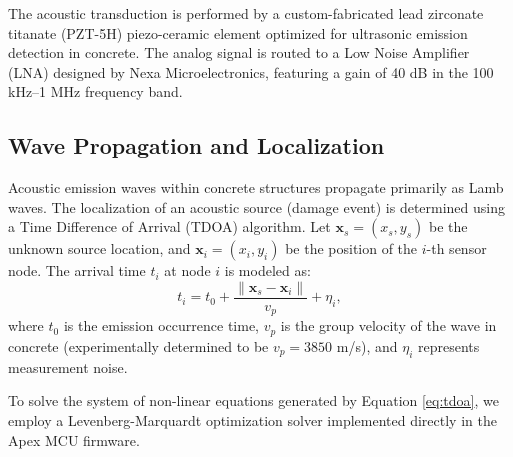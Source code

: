 The acoustic transduction is performed by a custom-fabricated lead zirconate titanate (PZT-5H) piezo-ceramic element optimized for ultrasonic emission detection in concrete. The analog signal is routed to a Low Noise Amplifier (LNA) designed by Nexa Microelectronics, featuring a gain of 40 dB in the 100 kHz--1 MHz frequency band.

\subsection{Wave Propagation and Localization}
Acoustic emission waves within concrete structures propagate primarily as Lamb waves. The localization of an acoustic source (damage event) is determined using a Time Difference of Arrival (TDOA) algorithm. Let $\mathbf{x}_s = (x_s, y_s)$ be the unknown source location, and $\mathbf{x}_i = (x_i, y_i)$ be the position of the $i$-th sensor node. The arrival time $t_i$ at node $i$ is modeled as:
\begin{equation}
    t_i = t_0 + \frac{\|\mathbf{x}_s - \mathbf{x}_i\|}{v_p} + \eta_i ,
    \label{eq:tdoa}
\end{equation}
where $t_0$ is the emission occurrence time, $v_p$ is the group velocity of the wave in concrete (experimentally determined to be $v_p = 3850$ m/s), and $\eta_i$ represents measurement noise.

To solve the system of non-linear equations generated by Equation \eqref{eq:tdoa}, we employ a Levenberg-Marquardt optimization solver implemented directly in the Apex MCU firmware.
